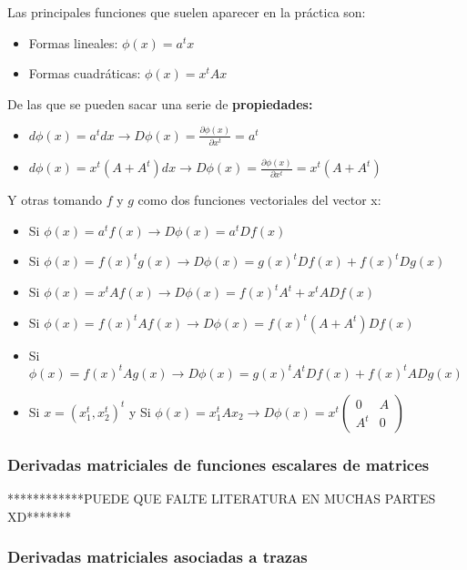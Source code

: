 \documentclass{article}
\theoremstyle{theorem-style}  %
\theoremstyle{definition-style}
\theoremstyle{example-style}
\theoremstyle{exercise-style}
\begin{document}
	Las principales funciones que suelen aparecer en la práctica son:
	
	\begin{itemize}
		\item Formas lineales: $\phi(x)=a^tx$
		\item Formas cuadráticas: $\phi(x)=x^tAx$
	\end{itemize}
	
	De las que se pueden sacar una serie de \textbf{propiedades:}
	
	\begin{itemize}
		\item $d\phi(x) = a^tdx \rightarrow D\phi(x) = \frac{\partial \phi(x)}{\partial x^t} = a^t$
		\item $d\phi(x) = x^t(A+A^t)dx \rightarrow D\phi(x) = \frac{\partial \phi(x)}{\partial x^t} = x^t(A+A^t)$
		
	\end{itemize}
	
	Y otras tomando $f$ y $g$ como dos funciones vectoriales del vector x:
	
	\begin{itemize}
		\item Si $\phi(x) = a^tf(x) \rightarrow D\phi(x) = a^tDf(x)$
		\item  Si $\phi(x) = f(x)^tg(x) \rightarrow D\phi(x) = g(x)^tDf(x)+ f(x)^tDg(x)$
		\item Si $\phi(x) = x^tAf(x) \rightarrow D\phi(x) = f(x)^t A^t + x^tADf(x)$
		\item Si $\phi(x) = f(x)^tAf(x) \rightarrow D\phi(x) = f(x)^t(A+A^t)Df(x)$
		\item Si $\phi(x) = f(x)^tAg(x) \rightarrow D\phi(x) = g(x)^tA^tDf(x)+ f(x)^tADg(x)$
		\item Si $x=(x_1^t,x_2^t)^t$ y Si $\phi(x) = x_1^tAx_2 \rightarrow D\phi(x) = x^t (\begin{array}{cc}
		0 & A\\
		A^t  & 0
		\end{array})$ 
	\end{itemize}
	
	\subsubsection{Derivadas matriciales de funciones escalares de matrices}
	
	
	************PUEDE QUE FALTE LITERATURA EN MUCHAS PARTES XD*******
	
	\subsubsection*{Derivadas matriciales asociadas a trazas}
	
\end{document}
